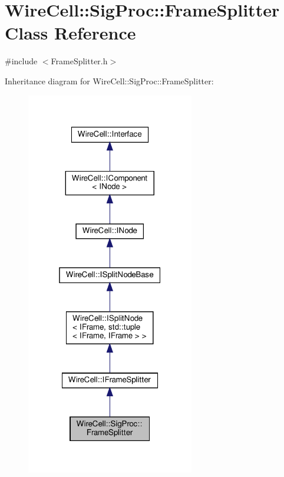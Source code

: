\hypertarget{class_wire_cell_1_1_sig_proc_1_1_frame_splitter}{}\section{Wire\+Cell\+:\+:Sig\+Proc\+:\+:Frame\+Splitter Class Reference}
\label{class_wire_cell_1_1_sig_proc_1_1_frame_splitter}


{\ttfamily \#include $<$Frame\+Splitter.\+h$>$}



Inheritance diagram for Wire\+Cell\+:\+:Sig\+Proc\+:\+:Frame\+Splitter\+:
\nopagebreak
\begin{figure}[H]
\begin{center}
\leavevmode
\includegraphics[width=208pt]{class_wire_cell_1_1_sig_proc_1_1_frame_splitter__inherit__graph}
\end{center}
\end{figure}


